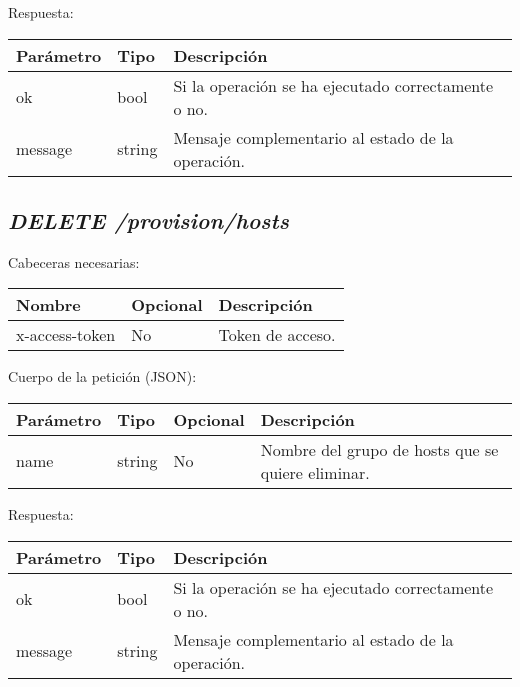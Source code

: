 Respuesta:
\begin{table}[!h]
	\centering
	\begin{adjustbox}{max width=\textwidth}
	\begin{tabular}{|l|l|l|}
		\hline
		Parámetro & Tipo & Descripción \\ \hline
		ok & bool & Si la operación se ha ejecutado correctamente o no. \\ \hline
		message & string & Mensaje complementario al estado de la operación. \\ \hline
	\end{tabular}
\end{adjustbox}
\end{table}

\subsection{\textit{DELETE /provision/hosts}}

Cabeceras necesarias:
\begin{table}[h!]
	\centering
	\begin{adjustbox}{max width=\textwidth}
	\begin{tabular}{|l|l|l|}
		\hline
		Nombre & Opcional & Descripción \\ \hline
		x-access-token & No & Token de acceso. \\ \hline
	\end{tabular}
\end{adjustbox}
\end{table}

Cuerpo de la petición (JSON):
\begin{table}[!h]
	\centering
	\begin{adjustbox}{max width=\textwidth}
	\begin{tabular}{|l|l|l|l|}
		\hline
		Parámetro & Tipo & Opcional & Descripción \\ \hline
		name & string & No & Nombre del grupo de hosts que se quiere eliminar. \\ \hline
	\end{tabular}
\end{adjustbox}
\end{table}

Respuesta:
\begin{table}[!h]
	\centering
	\begin{adjustbox}{max width=\textwidth}
	\begin{tabular}{|l|l|l|}
		\hline
		Parámetro & Tipo & Descripción \\ \hline
		ok & bool & Si la operación se ha ejecutado correctamente o no. \\ \hline
		message & string & Mensaje complementario al estado de la operación. \\ \hline
	\end{tabular}
\end{adjustbox}
\end{table}









